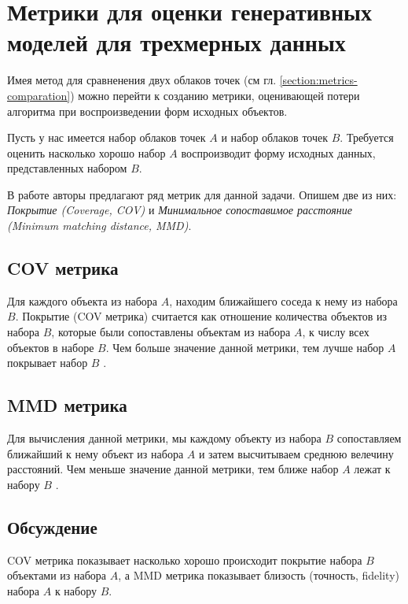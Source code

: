 \section{Метрики для оценки генеративных моделей для трехмерных данных} \label{section:metrics-evaluation}

Имея метод для сравненения двух облаков точек (см гл. \ref{section:metrics-comparation}) можно перейти к созданию метрики, оценивающей потери алгоритма при воспроизведении форм исходных объектов.

Пусть у нас имеется набор облаков точек \(A\) и набор облаков точек \(B\). Требуется оценить насколько хорошо набор \(A\) воспроизводит форму исходных данных, представленных набором \(B\).

В работе \cite{lrgm-cloud} авторы предлагают ряд метрик для данной задачи. Опишем две из них: \textit{Покрытие (Coverage, COV)} и \textit{Минимальное сопоставимое расстояние (Minimum matching distance, MMD)}.


\subsection{COV метрика}

Для каждого объекта из набора \(A\), находим ближайшего соседа к нему из набора \(B\). Покрытие (COV метрика) считается как отношение количества объектов из набора \(B\), которые были сопоставлены объектам из набора \(A\), к числу всех объектов в наборе \(B\). Чем больше значение данной метрики, тем лучше набор \(A\) покрывает набор \(B\) \cite{lrgm-cloud}.

\subsection{MMD метрика}

Для вычисления данной метрики, мы каждому объекту из набора \(B\) сопоставляем ближайший к нему объект из набора \(A\) и затем высчитываем среднюю велечину расстояний. Чем меньше значение данной метрики, тем ближе набор \(A\) лежат к набору \(B\) \cite{lrgm-cloud}.


\subsection{Обсуждение}

COV метрика показывает насколько хорошо происходит покрытие набора \(B\) объектами из набора \(A\), а MMD метрика показывает близость (точность, fidelity) набора \(A\) к набору \(B\). 

